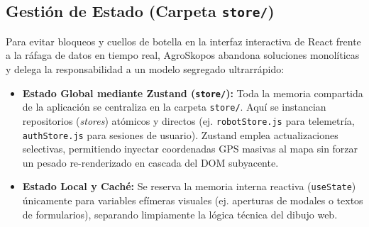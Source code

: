 \subsection{Gestión de Estado (Carpeta \texttt{store/})}
Para evitar bloqueos y cuellos de botella en la interfaz interactiva de React frente a la ráfaga de datos en tiempo real, AgroSkopos abandona soluciones monolíticas y delega la responsabilidad a un modelo segregado ultrarrápido:
\begin{itemize}
    \item \textbf{Estado Global mediante Zustand (\texttt{store/}):} Toda la memoria compartida de la aplicación se centraliza en la carpeta \texttt{store/}. Aquí se instancian repositorios (\textit{stores}) atómicos y directos (ej. \texttt{robotStore.js} para telemetría, \texttt{authStore.js} para sesiones de usuario). Zustand emplea actualizaciones selectivas, permitiendo inyectar coordenadas GPS masivas al mapa sin forzar un pesado re-renderizado en cascada del DOM subyacente.
    \item \textbf{Estado Local y Caché:} Se reserva la memoria interna reactiva (\texttt{useState}) únicamente para variables efímeras visuales (ej. aperturas de modales o textos de formularios), separando limpiamente la lógica técnica del dibujo web.
\end{itemize}

